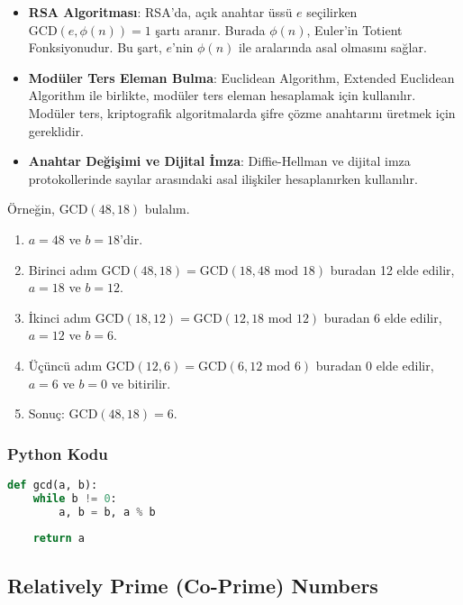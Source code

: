 \begin{itemize}
    \item \textbf{RSA Algoritması}: RSA'da, açık anahtar üssü $e$ seçilirken $\text{GCD}(e, \phi(n)) = 1$ şartı aranır. Burada $\phi(n)$, Euler'in Totient Fonksiyonudur. Bu şart, $e$'nin $\phi(n)$ ile aralarında asal olmasını sağlar.
    \item \textbf{Modüler Ters Eleman Bulma}: Euclidean Algorithm, Extended Euclidean Algorithm ile birlikte, modüler ters eleman hesaplamak için kullanılır. Modüler ters, kriptografik algoritmalarda şifre çözme anahtarını üretmek için gereklidir.
    \item \textbf{Anahtar Değişimi ve Dijital İmza}: Diffie-Hellman ve dijital imza protokollerinde sayılar arasındaki asal ilişkiler hesaplanırken kullanılır.
\end{itemize}

Örneğin, $\text{GCD}(48, 18)$ bulalım.

\begin{enumerate}
    \item $a = 48$ ve $b = 18$'dir.
    \item Birinci adım $\text{GCD}(48, 18) = \text{GCD}(18, 48 \text{ mod } 18)$ buradan 12 elde edilir, $a = 18$ ve $b = 12$.
    \item İkinci adım $\text{GCD}(18, 12) = \text{GCD}(12, 18 \text{ mod } 12)$ buradan 6 elde edilir, $a = 12$ ve $b = 6$.
    \item Üçüncü adım $\text{GCD}(12, 6) = \text{GCD}(6, 12 \text{ mod } 6)$ buradan 0 elde edilir, $a = 6$ ve $b = 0$ ve bitirilir.
    \item Sonuç: $\text{GCD}(48, 18) = 6$.
\end{enumerate}

\subsubsection{Python Kodu}

\begin{lstlisting}[language=Python]
def gcd(a, b):
    while b != 0:
        a, b = b, a % b
        
    return a
\end{lstlisting}

\newpage

\subsection{Relatively Prime (Co-Prime) Numbers}

